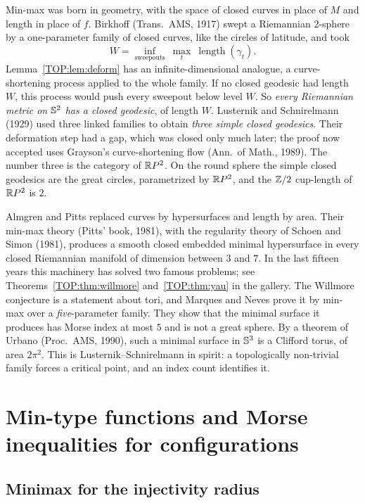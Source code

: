 Min-max was born in geometry, with the space of closed curves in place of $M$ and length in place
of $f$. Birkhoff (Trans.\ AMS, 1917) swept a Riemannian $2$-sphere by a one-parameter family of closed
curves, like the circles of latitude, and took
\[
  W=\inf_{\text{sweepouts}}\ \max_t\ \operatorname{length}(\gamma_t).
\]
Lemma~\ref{TOP:lem:deform} has an infinite-dimensional analogue, a curve-shortening process applied to the
whole family. If no closed geodesic had length $W$, this process would push every sweepout below level
$W$. So \emph{every Riemannian metric on $\mathbb{S}^2$ has a closed geodesic}, of length $W$. Lusternik and
Schnirelmann (1929) used three linked families to obtain \emph{three simple closed geodesics}. Their
deformation step had a gap, which was closed only much later; the proof now accepted uses Grayson's
curve-shortening flow (Ann.\ of Math., 1989). The number three is the category of $\mathbb{R} P^2$. On the round
sphere the simple closed geodesics are the great circles, parametrized by $\mathbb{R} P^2$, and the $\mathbb{Z}/2$
cup-length of $\mathbb{R} P^2$ is $2$.

Almgren and Pitts replaced curves by hypersurfaces and length by area. Their min-max theory (Pitts' book,
1981), with the regularity theory of Schoen and Simon (1981), produces a smooth closed embedded minimal
hypersurface in every closed Riemannian manifold of dimension between $3$ and $7$. In the last fifteen
years this machinery has solved two famous problems; see Theorems~\ref{TOP:thm:willmore}
and~\ref{TOP:thm:yau} in the gallery. The Willmore conjecture is a statement about tori, and Marques and Neves
prove it by min-max over a \emph{five}-parameter family. They show that the minimal surface it produces
has Morse index at most $5$ and is not a great sphere. By a theorem of Urbano (Proc.\ AMS, 1990), such a
minimal surface in $\mathbb{S}^3$ is a Clifford torus, of area $2\pi^2$. This is Lusternik--Schnirelmann in spirit: a topologically non-trivial family forces a
critical point, and an index count identifies it.

\section{Min-type functions and Morse inequalities for configurations}
\label{TOP:sec:mintype}

\subsection{Minimax for the injectivity radius}

